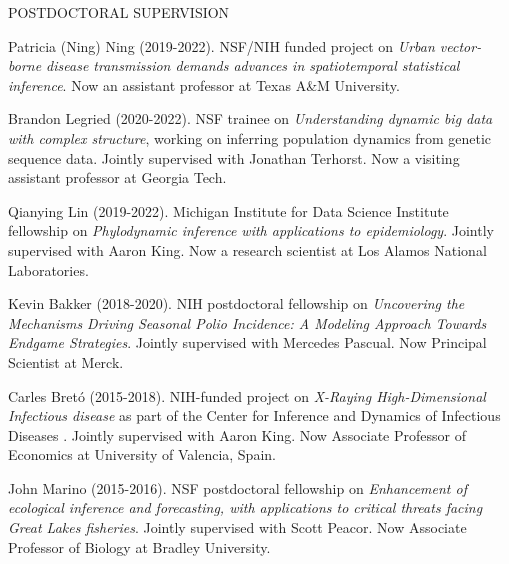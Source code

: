 \begin{reflist}{POSTDOCTORAL SUPERVISION}

\item{Patricia (Ning) Ning } (2019-2022). NSF/NIH funded project on {\it Urban vector-borne disease transmission demands advances in spatiotemporal statistical inference}. Now an assistant professor at Texas A\&M University.

\item{Brandon Legried } (2020-2022). NSF trainee on {\it Understanding dynamic big data with complex structure}, working on inferring population dynamics from genetic sequence data. Jointly supervised with Jonathan Terhorst. Now a visiting assistant professor at Georgia Tech.
  
\item{Qianying Lin } (2019-2022). Michigan Institute for Data Science Institute fellowship on {\it Phylodynamic inference with applications to epidemiology}.  Jointly supervised with Aaron King. Now a research scientist at Los Alamos National Laboratories.
  
\item{Kevin Bakker} (2018-2020). NIH postdoctoral fellowship on {\it Uncovering the Mechanisms Driving Seasonal Polio Incidence: A Modeling Approach Towards Endgame Strategies}. Jointly supervised with Mercedes Pascual. Now Principal Scientist at Merck.

\item{Carles Bret\'{o}} (2015-2018). NIH-funded project on {\it X-Raying High-Dimensional Infectious disease} as part of the Center for Inference and Dynamics of Infectious Diseases .  Jointly supervised with Aaron King. Now Associate Professor of Economics at University of Valencia, Spain.

\item{John Marino} (2015-2016). NSF postdoctoral fellowship on {\it Enhancement of ecological inference and forecasting, with applications to critical threats facing Great Lakes fisheries}. Jointly supervised with Scott Peacor. Now Associate Professor of Biology at Bradley University.
  
\end{reflist}

\lsp

